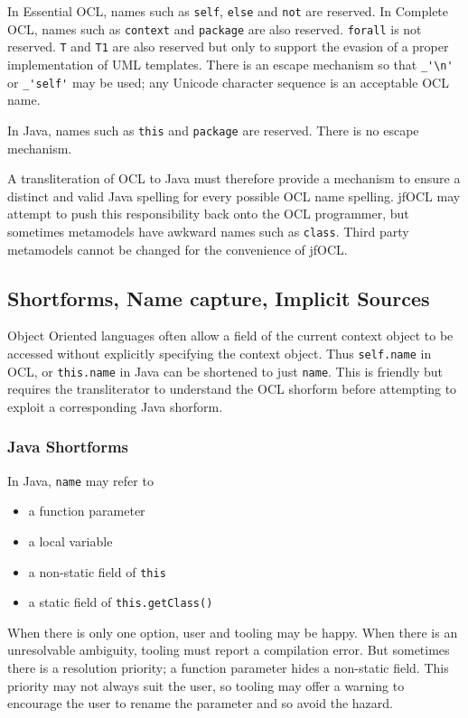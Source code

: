 \documentclass[sigconf]{acmart}
\begin{document}
In Essential OCL, names such as \verb|self|, \verb|else| and \verb|not| are reserved. In Complete OCL, names such as \verb|context| and \verb|package| are also reserved. \verb|forall| is not reserved. \verb|T| and \verb|T1| are also reserved but only to support the evasion of a proper implementation of UML templates. There is an escape mechanism so that \verb|_'\n'| or \verb|_'self'| may be used; any Unicode character sequence is an acceptable OCL name.

In Java, names such as \verb|this| and \verb|package| are reserved. There is no escape mechanism.

A transliteration of OCL to Java must therefore provide a mechanism to ensure a distinct and valid Java spelling for every possible OCL name spelling. jfOCL may attempt to push this responsibility back onto the OCL programmer, but sometimes metamodels have awkward names such as \verb|class|. Third party metamodels cannot be changed for the convenience of jfOCL.

\subsection{Shortforms, Name capture, Implicit Sources}

Object Oriented languages often allow a field of the current context object to be accessed without explicitly specifying the context object. Thus \texttt{self.name} in OCL, or \texttt{this.name} in Java can be shortened to just \texttt{name}. This is friendly but requires the transliterator to understand the OCL shorform before attempting to exploit a corresponding Java shorform.

\subsubsection{Java Shortforms}

In Java, \texttt{name} may refer to
\begin{itemize}
	\item a function parameter
	\item a local variable
	\item a non-static field of \texttt{this}
	\item a static field of \texttt{this.getClass()}
\end{itemize}
When there is only one option, user and tooling may be happy. When there is an unresolvable ambiguity, tooling must report a compilation error. But sometimes there is a resolution priority; a function parameter hides a non-static field. This priority may not always suit the user, so tooling may offer a warning to encourage the user to rename the parameter and so avoid the hazard.
\end{document}

